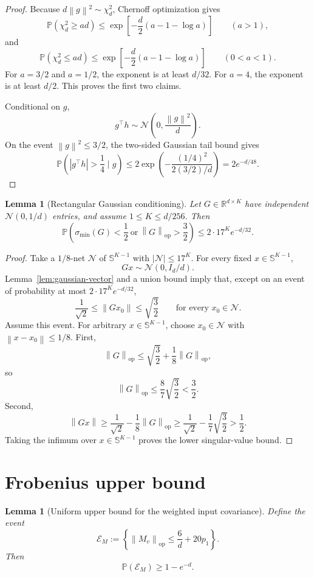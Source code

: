 \documentclass[11pt]{article}
\newtheorem{lemma}[theorem]{Lemma}
\newcommand{\R}{\mathbb{R}}
\newcommand{\Pp}{\mathbb{P}}
\newcommand{\1}{\mathbf{1}}
\newcommand{\op}{\mathrm{op}}
\newcommand{\norm}[1]{\left\|#1\right\|}
\newcommand{\abs}[1]{\left|#1\right|}
\newcommand{\sphere}{\mathbb{S}}
\begin{document}
\begin{proof}
Because \(d\norm{g}^2\sim\chi_d^2\), Chernoff optimization gives
\[
 \Pp(\chi_d^2\ge ad)
 \le
 \exp\left[-\frac d2(a-1-\log a)\right]
 \qquad (a>1),
\]
and
\[
 \Pp(\chi_d^2\le ad)
 \le
 \exp\left[-\frac d2(a-1-\log a)\right]
 \qquad (0<a<1).
\]
For \(a=3/2\) and \(a=1/2\), the exponent is at least \(d/32\).  For
\(a=4\), the exponent is at least \(d/2\).  This proves the first two claims.

Conditional on \(g\),
\[
 g^\top h\sim\mathcal N\left(0,\frac{\norm{g}^2}{d}\right).
\]
On the event \(\norm{g}^2\le3/2\), the two-sided Gaussian tail bound gives
\[
 \Pp\left(\abs{g^\top h}>\frac14\mid g\right)
 \le
 2\exp\left(-\frac{(1/4)^2}{2(3/2)/d}\right)
 =2e^{-d/48}.
\]
\end{proof}

\begin{lemma}[Rectangular Gaussian conditioning]
\label{lem:rectangular-gaussian}
Let \(G\in\R^{d\times K}\) have independent \(\mathcal N(0,1/d)\) entries,
and assume \(1\le K\le d/256\).  Then
\[
 \Pp\left(
 \sigma_{\min}(G)<\frac12
 \ \text{or}\ 
 \norm{G}_{\op}>\frac32
 \right)
 \le
 2\cdot17^K e^{-d/32}.
\]
\end{lemma}

\begin{proof}
Take a \(1/8\)-net \(\mathcal N\) of \(\sphere^{K-1}\) with
\(\abs{\mathcal N}\le17^K\).  For every fixed \(x\in\sphere^{K-1}\),
\[
 Gx\sim\mathcal N(0,I_d/d).
\]
Lemma~\ref{lem:gaussian-vector} and a union bound imply that, except on an
event of probability at most \(2\cdot17^K e^{-d/32}\),
\[
 \frac1{\sqrt2}\le\norm{Gx_0}\le\sqrt{\frac32}
 \qquad\text{for every }x_0\in\mathcal N.
\]
Assume this event.  For arbitrary \(x\in\sphere^{K-1}\), choose
\(x_0\in\mathcal N\) with \(\norm{x-x_0}\le1/8\).  First,
\[
 \norm{G}_{\op}
 \le
 \sqrt{\frac32}+\frac18\norm{G}_{\op},
\]
so
\[
 \norm{G}_{\op}
 \le
 \frac87\sqrt{\frac32}<\frac32.
\]
Second,
\[
 \norm{Gx}
 \ge
 \frac1{\sqrt2}
 -\frac18\norm{G}_{\op}
 \ge
 \frac1{\sqrt2}
 -\frac17\sqrt{\frac32}
 >\frac12.
\]
Taking the infimum over \(x\in\sphere^{K-1}\) proves the lower singular-value
bound.
\end{proof}

\section{Frobenius upper bound}
\label{sec:frobenius-upper}

\begin{lemma}[Uniform upper bound for the weighted input covariance]
\label{lem:Mv-upper}
Define the event
\[
 \mathcal E_M
 :=
 \left\{
 \norm{M_v}_{\op}\le\frac6d+20p_1
 \right\}.
\]
Then
\[
 \Pp(\mathcal E_M)\ge1-e^{-d}.
\]
\end{lemma}
\end{document}
